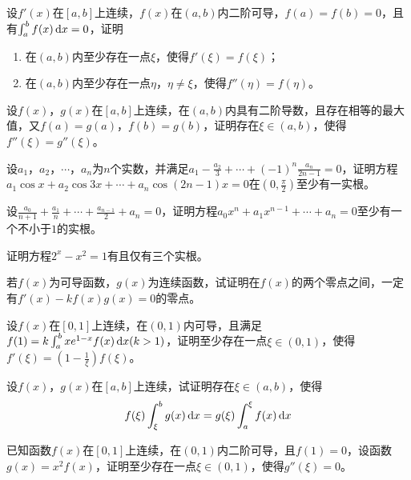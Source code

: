 \begin{example}
	设$f'(x)$在$[a,b]$上连续，$f(x)$在$(a,b)$内二阶可导，$f(a)=f(b)=0$，且有$\int_{a}^{b}f(x)\,\mathrm{d} x=0$，证明
	\begin{enumerate}
		\item 在$(a,b)$内至少存在一点$\xi$，使得$f'(\xi)=f(\xi)$；
		\item 在$(a,b)$内至少存在一点$\eta$，$\eta\neq\xi$，使得$f''(\eta)=f(\eta)$。
	\end{enumerate}
\end{example}

\begin{example}
	设$f(x)$，$g(x)$在$[a,b]$上连续，在$(a,b)$内具有二阶导数，且存在相等的最大值，又$f(a)=g(a)$，$f(b)=g(b)$，证明存在$\xi\in(a,b)$，使得$f''(\xi)=g''(\xi)$。
\end{example}

\begin{example}
	设$a_1$，$a_2$，$\cdots$，$a_n$为$n$个实数，并满足$a_1-\frac{a_2}{3}+\cdots+(-1)^n\frac{a_n}{2n-1}=0$，证明方程$a_1\cos x+a_2\cos 3x+\cdots+a_n\cos (2n-1)x=0$在$(0,\frac{\pi}{2})$至少有一实根。
\end{example}

\begin{example}
	设$\frac{a_0}{n+1}+\frac{a_1}{n}+\cdots+\frac{a_{n-1}}{2}+a_n=0$，证明方程$a_0x^n+a_1x^{n-1}+\cdots+a_n=0$至少有一个不小于$1$的实根。
\end{example}

\begin{example}
	证明方程$2^x-x^2=1$有且仅有三个实根。
\end{example}

\begin{example}
	若$f(x)$为可导函数，$g(x)$为连续函数，试证明在$f(x)$的两个零点之间，一定有$f'(x)-kf(x)g(x)=0$的零点。
\end{example}

\begin{example}
	设$f(x)$在$[0,1]$上连续，在$(0,1)$内可导，且满足$f(1)=k\int_{a}^{b}xe^{1-x}f(x)\,\mathrm{d} x(k>1)$，证明至少存在一点$\xi\in(0,1)$，使得$f'(\xi)=(1-\frac{1}{\xi})f(\xi)$。
\end{example}

\begin{example}
	设$f(x)$，$g(x)$在$[a,b]$上连续，试证明存在$\xi\in(a,b)$，使得\[f(\xi)\int_{\xi}^{b}g(x)\,\mathrm{d} x=g(\xi)\int_{a}^{\xi}f(x)\,\mathrm{d} x\]
\end{example}

\begin{example}
	已知函数$f(x)$在$[0,1]$上连续，在$(0,1)$内二阶可导，且$f(1)=0$，设函数$g(x)=x^2f(x)$，证明至少存在一点$\xi\in(0,1)$，使得$g''(\xi)=0$。
\end{example}

